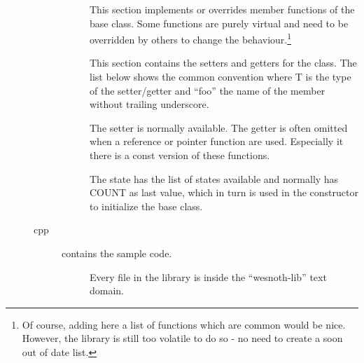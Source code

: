 \begin{description}
\begin{description}
\begin{description}
	\item[]
		This section implements or overrides member functions of the base class.
		Some functions are purely virtual and need to be overridden by others to
		change the behaviour.\footnote{Of course, adding here a list of functions which are
		common would be nice. However, the library is still too
		volatile to do so - no need to create a soon out of date list.}

	\item[]
		This section contains the setters and getters for the class. The
		list below shows the common convention where T is the type of the
		setter/getter and ``foo'' the name of the member without trailing
		underscore.


		The setter is normally available. The getter is often omitted when a
		reference or pointer function are used. Especially it there is a const
		version of these functions.

	\item[]
		The state has the list of states available and normally has COUNT as
		last value, which in turn is used in the constructor to initialize the
		base class.

	\end{description}

\item[cpp]  contains the sample code. 
	\begin{description}
	\item[] Every file in the library
		is inside the ``wesnoth-lib'' text domain.


\end{description}
\end{description}
\end{description}
